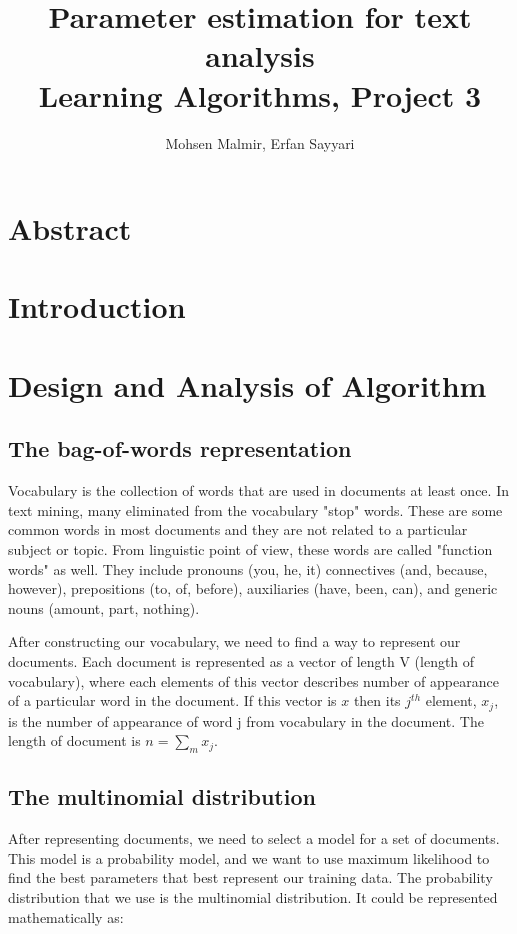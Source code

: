 \documentclass[twoside,12pt]{article}
\begin{document}
\title{Parameter estimation for text analysis\\  Learning Algorithms, Project 3}
\author{Mohsen Malmir, Erfan Sayyari}
\maketitle
\section{Abstract}


\section{Introduction}



\section{Design and Analysis of Algorithm}

\subsection{The bag-of-words representation}
Vocabulary is the collection of words that are used in documents at least once. In text mining, many eliminated from the vocabulary "stop" words. These are some common words in most documents and they are not related to a particular subject or topic. From linguistic point of view, these words are called "function words" as well. They include pronouns (you, he, it) connectives (and, because, however), prepositions (to, of, before), auxiliaries (have, been, can), and generic nouns (amount, part, nothing). 

After constructing our vocabulary, we need to find a way to represent our documents. Each document is represented as a vector of length V (length of vocabulary), where each elements of this vector describes number of appearance of a particular word in the document. If this vector is $x$ then its $j^{th}$ element, $x_j$, is the number of appearance of word j from vocabulary in the document. The length of document is $n=\sum_{m}x_j.$
\subsection{The multinomial distribution}
After representing documents, we need to select a model for a set of documents. This model is a probability model, and we want to use maximum likelihood to find the best parameters that best represent our training data. The probability distribution that we use is the multinomial distribution. It could be represented mathematically as:
\end{document}
